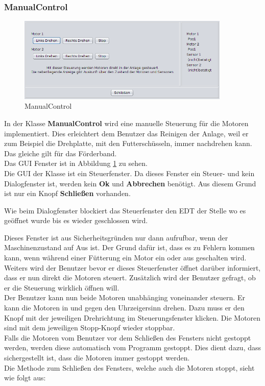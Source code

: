 \subsubsection{ManualControl}
  \begin{figure}[H]
    \includegraphics[width=0.90\textwidth]{Bilder/GUI/ManualControl}
    \caption{ManualControl}
  \label{ManualControl}
  \end{figure}
In der Klasse \textbf{ManualControl} wird eine manuelle Steuerung für die Motoren implementiert. Dies erleichtert dem Benutzer das Reinigen der Anlage, weil er zum Beispiel die Drehplatte, mit den Futterschüsseln, immer nachdrehen kann. Das gleiche gilt für das Förderband.
\\ Das \ac{GUI} Fenster ist in Abbildung \ref{ManualControl} zu sehen.
\\ Die \ac{GUI} der Klasse ist ein Steuerfenster. Da dieses Fenster ein Steuer- und kein Dialogfenster ist, werden kein \textbf{Ok} und \textbf{Abbrechen} benötigt. Aus diesem Grund ist nur ein Knopf \textbf{Schließen} vorhanden.

\vspace{10pt}

Wie beim Dialogfenster blockiert das Steuerfenster den \ac{EDT} der Stelle wo es geöffnet wurde bis es wieder geschlossen wird.

\vspace{10pt}

Dieses Fenster ist aus Sicherheitsgründen nur dann aufrufbar, wenn der Maschinenzustand auf Aus ist. Der Grund dafür ist, dass es zu Fehlern kommen kann, wenn während einer Fütterung ein Motor ein oder aus geschalten wird.
\\ Weiters wird der Benutzer bevor er dieses Steuerfenster öffnet darüber informiert, dass er nun direkt die Motoren steuert. Zusätzlich wird der Benutzer gefragt, ob er die Steuerung wirklich öffnen will.
\\ Der Benutzer kann nun beide Motoren unabhänging voneinander steuern. Er kann die Motoren in und gegen den Uhrzeigersinn drehen. Dazu muss er den Knopf mit der jeweiligen Drehrichtung im Steuerungsfenster klicken. Die Motoren sind mit dem jeweiligen Stopp-Knopf wieder stoppbar.
\\ Falls die Motoren vom Benutzer vor dem Schließen des Fensters nicht gestoppt werden, werden diese automatisch vom Programm gestoppt. Dies dient dazu, dass sichergestellt ist, dass die Motoren immer gestoppt werden.
\\ Die Methode zum Schließen des Fensters, welche auch die Motoren stoppt, sieht wie folgt aus:

